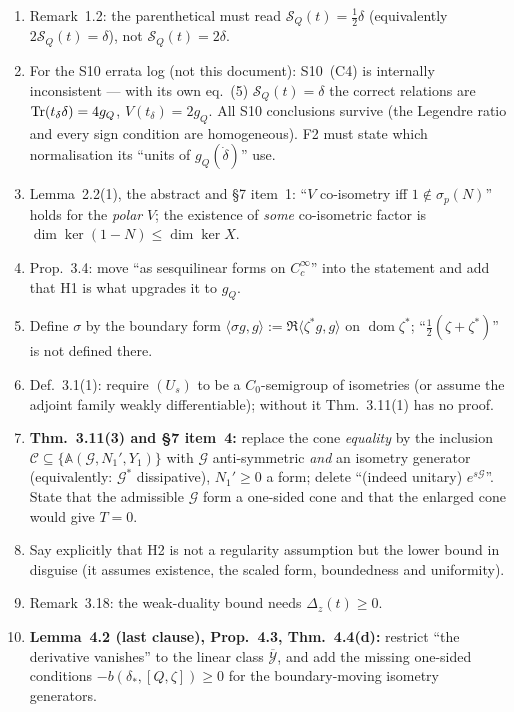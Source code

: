 \documentclass[11pt]{article}
\newcommand{\SLD}{\mathcal S_Q}
\newcommand{\Aop}{\mathbb A}
\begin{document}
\begin{enumerate}[leftmargin=2.6em,itemsep=1pt,label=\textbf{R\arabic*.}]
\item Remark~1.2: the parenthetical must read $\SLD(t)=\frac12\delta$ (equivalently
 $2\SLD(t)=\delta$), not $\SLD(t)=2\delta$.
\item For the S10 errata log (not this document): S10~(C4) is internally inconsistent ---
 with its own eq.~(5) $\SLD(t)=\delta$ the correct relations are $\operatorname{Tr}(t_\delta\delta)=4g_Q$,
 $V(t_\delta)=2g_Q$.  All S10 conclusions survive (the Legendre ratio and every sign
 condition are homogeneous).  F2 must state which normalisation its ``units of
 $g_Q(\dot\delta)$'' use.
\item Lemma~2.2(1), the abstract and \S7 item~1: ``$V$ co-isometry iff $1\notin\sigma_p(N)$''
 holds for the \emph{polar} $V$; the existence of \emph{some} co-isometric factor is
 $\dim\ker(1-N)\le\dim\ker X$.
\item Prop.~3.4: move ``as sesquilinear forms on $C_c^\infty$'' into the statement and add
 that H1 is what upgrades it to $g_Q$.
\item Define $\sigma$ by the boundary form $\langle\sigma g,g\rangle:=\Re\langle\zeta^*g,g\rangle$
 on $\operatorname{dom}\zeta^*$; ``$\frac12(\zeta+\zeta^*)$'' is not defined there.
\item Def.~3.1(1): require $(U_s)$ to be a $C_0$-semigroup of isometries (or assume the
 adjoint family weakly differentiable); without it Thm.~3.11(1) has no proof.
\item \textbf{Thm.~3.11(3) and \S7 item~4:} replace the cone \emph{equality} by the
 inclusion $\mathcal C\subseteq\{\Aop(\mathcal G,N_1',Y_1)\}$ with $\mathcal G$
 anti-symmetric \emph{and} an isometry generator (equivalently: $\mathcal G^*$ dissipative),
 $N_1'\ge0$ a form; delete ``(indeed unitary) $e^{s\mathcal G}$''.  State that the
 admissible $\mathcal G$ form a one-sided cone and that the enlarged cone would give $T=0$.
\item Say explicitly that H2 is not a regularity assumption but the lower bound in disguise
 (it assumes existence, the scaled form, boundedness and uniformity).
\item Remark~3.18: the weak-duality bound needs $\Delta_z(t)\ge0$.
\item \textbf{Lemma~4.2 (last clause), Prop.~4.3, Thm.~4.4(d):} restrict ``the derivative
 vanishes'' to the linear class $\overline{\mathcal Y}$, and add the missing one-sided
 conditions $-b(\delta_*,[Q,\zeta])\ge0$ for the boundary-moving isometry generators.

\end{enumerate}
\end{document}
